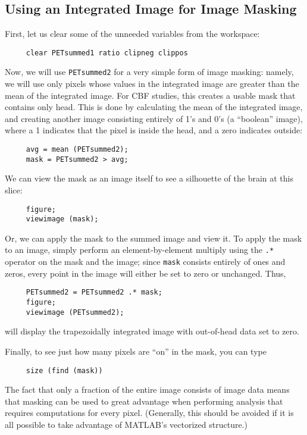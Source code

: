 \subsection{Using an Integrated Image for Image Masking}

First, let us clear some of the unneeded variables from the workspace:
\begin{verbatim}
     clear PETsummed1 ratio clipneg clippos
\end{verbatim}

Now, we will use \verb|PETsummed2| for a very simple form of image
masking: namely, we will use only pixels whose values in the
integrated image are greater than the mean of the integrated image.
For CBF studies, this creates a usable mask that contains only head.
This is done by calculating the mean of the integrated image, and
creating another image consisting entirely of 1's and 0's (a
``boolean'' image), where a 1 indicates that the pixel is inside the
head, and a zero indicates outside:
\begin{verbatim}
     avg = mean (PETsummed2);
     mask = PETsummed2 > avg;
\end{verbatim}

We can view the mask as an image itself to see a silhouette of the
brain at this slice:
\begin{verbatim}
     figure;
     viewimage (mask);
\end{verbatim}
Or, we can apply the mask to the summed image and view it.  To apply
the mask to an image, simply perform an element-by-element multiply 
using the
\verb|.*| operator on the mask and the image; since \verb|mask|
consists entirely of ones and zeros, every point in the image will
either be set to zero or unchanged.  Thus,
\begin{verbatim}
     PETsummed2 = PETsummed2 .* mask;
     figure;
     viewimage (PETsummed2);
\end{verbatim}
will display the trapezoidally integrated image with out-of-head data
set to zero.

Finally, to see just how many pixels are ``on'' in the mask, you can type
\begin{verbatim}
     size (find (mask))
\end{verbatim}
The fact that only a fraction of the entire image consists of image
data means that masking can be used to great advantage when
performing analysis that requires computations for every pixel.
(Generally, this should be avoided if it is all possible to take
advantage of MATLAB's vectorized structure.)

